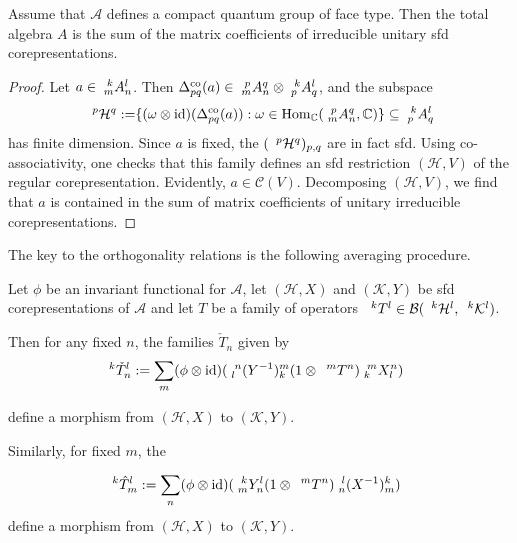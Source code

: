 \begin{Prop} \label{prop:rep-weak-pw}
  Assume that $\mathscr{A}$ defines a compact quantum group of face type. Then the total algebra $A$ is the sum of the matrix coefficients of
 irreducible unitary sfd corepresentations.
\end{Prop}
\begin{proof}
  Let $a \in \Gr{A}{k}{l}{m}{n}$. Then
  $\Delta^{\co}_{pq}(a) \in
  \Gr{A}{p}{q}{m}{n} \otimes \Gr{A}{k}{l}{p}{q}$, and the subspace
    \begin{align*}
    \Gru{\mathcal{H}}{p}{q} &:= \span \{ (\omega \otimes \id)(
    \Delta^{\co}_{pq}(a)) : \omega \in \Hom_{\C}(\Gr{A}{p}{q}{m}{n},\C) \} \subseteq
    \Gr{A}{k}{l}{p}{q}
  \end{align*}
  has finite dimension. Since $a$ is fixed, the
  $(\Gru{\mathcal{H}}{p}{q})_{p,q}$ are in fact sfd. Using
  co-associativity, one checks that this family defines an sfd restriction $(\mathcal{H},V)$ of the regular
  corepresentation. Evidently, $a \in \mathcal{C}(V)$. Decomposing
  $(\mathcal{H},V)$, we find that
  $a$ is contained in the sum of matrix coefficients of unitary
  irreducible corepresentations.
\end{proof}
The key to the orthogonality relations is the following averaging procedure.
\begin{Lem} \label{lem:rep-average}
  Let $\phi$ be an invariant functional for $\mathscr{A}$, let
  $(\mathcal{H},X)$ and $(\mathcal{K},Y)$ be sfd corepresentations of $\mathscr{A}$ and let $T$ be
  a family of operators $\Gru{T}{k}{l} \in
  \mathcal{B}(\Gru{\mathcal{H}}{k}{l},\Gru{\mathcal{K}}{k}{l})$.
  
  Then for any fixed $n$, the families $\check T_n$ given by
  \begin{align*}
    \Gru{\check T_n}{k}{l} &:= \sum_{m} (\phi \otimes
    \id)(\Gr{(Y^{-1})}{n}{m}{l}{k}(1\otimes
    \Gru{T}{m}{n})\Gr{X}{m}{n}{k}{l})
   \end{align*} 
   
  define a morphism from $(\mathcal{H},X)$ to $(\mathcal{K},Y)$.

     Similarly, for fixed $m$, the      
    
  \begin{align*} \Gru{\hat T_m}{k}{l} &:= \sum_{n} (\phi \otimes
    \id)(\Gr{Y}{k}{l}{m}{n}(1\otimes
    \Gru{T}{m}{n})\Gr{(X^{-1})}{l}{k}{n}{m})
  \end{align*}
  define a morphism from $(\mathcal{H},X)$ to $(\mathcal{K},Y)$. %
\end{Lem} 
